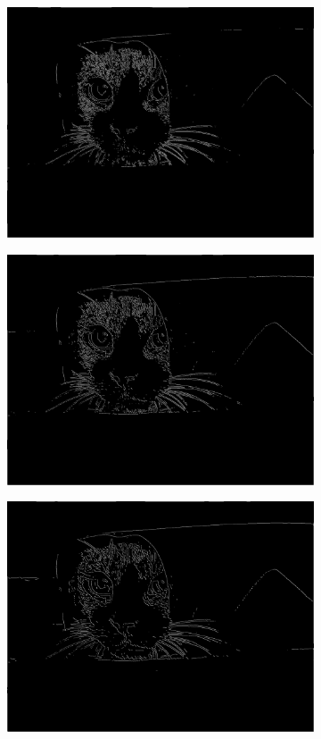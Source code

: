 \documentclass[a4paper]{article}
\begin{document}
\begin{figure}[h]
\begin{subfigure}{0.33\textwidth}
\includegraphics[width=\textwidth]{img/sigma1/catnont.png}
\end{subfigure}
\begin{subfigure}{0.33\textwidth}
\includegraphics[width=\textwidth]{img/sigma2/catnont.png}
\end{subfigure}
\begin{subfigure}{0.33\textwidth}
\includegraphics[width=\textwidth]{img/sigma3/catnont.png}

\end{subfigure}
\end{figure}
\end{document}
